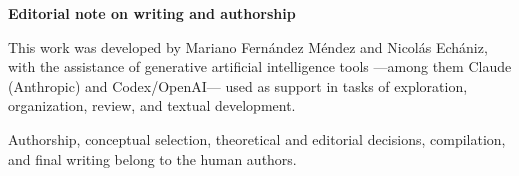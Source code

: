 \clearpage
\thispagestyle{empty}
\vspace*{0.24\textheight}

\begin{center}
\begin{minipage}{0.7\textwidth}
\setlength{\parindent}{0pt}
\setlength{\parskip}{0.95em}
\raggedright

{\Large\bfseries Editorial note on writing and authorship\par}
\vspace{0.4em}
\frontcutdivider[0.09\textwidth]

\vspace{1.2em}

This work was developed by Mariano Fern\'andez M\'endez and Nicol\'as Ech\'aniz, with the assistance of generative artificial intelligence tools ---among them Claude (Anthropic) and Codex/OpenAI--- used as support in tasks of exploration, organization, review, and textual development.

Authorship, conceptual selection, theoretical and editorial decisions, compilation, and final writing belong to the human authors.

\end{minipage}
\end{center}
